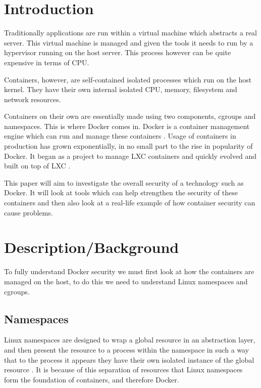 \documentclass{article}
\author{Stephen Coady}
\begin{document}

\thispagestyle{empty}

\newpage
\tableofcontents
\newpage

\newpage
\section{Introduction}
\label{sec:Introduction} %
Traditionally applications are run within a virtual machine which abstracts a real server. This virtual machine is managed and given the tools it needs to run by a hypervisor running on the host server. This process however can be quite expensive in terms of CPU.

Containers, however, are self-contained isolated processes which run on the host kernel. They have their own internal isolated CPU, memory, filesystem and network resources. 

Containers on their own are essentially made using two components, cgroups and namespaces. This is where Docker comes in. Docker is a container management engine which can run and manage these containers \citep{Wang2016}. Usage of containers in production has grown exponentially, in no small part to the rise in popularity of Docker. It began as a project to manage LXC containers and quickly evolved and built on top of LXC \citep{BCN}.

This paper will aim to investigate the overall security of a technology such as Docker. It will look at tools which can help strengthen the security of these containers and then also look at a real-life example of how container security can cause problems.

\newpage
\section{Description/Background}
\label{sec:Description/Background}

To fully understand Docker security we must first look at how the containers are managed on the host, to do this we need to understand Linux namespaces and cgroups.

\subsection{Namespaces}
\label{subs:Namespaces}
Linux namespaces are designed to wrap a global resource in an abstraction layer, and then present the resource to a process within the namespace in such a way that to the process it appears they have their own isolated instance of the global resource \citep{Kerrisk2013}. It is because of this separation of resources that Linux namespaces form the foundation of containers, and therefore Docker.
\end{document}
